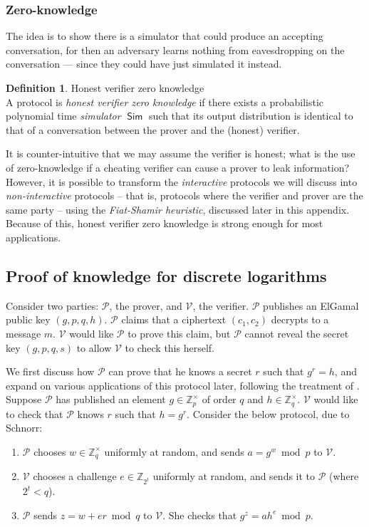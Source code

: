 \documentclass[11pt,twoside,a4paper]{article}
\DeclareMathOperator{\Sim}{\mathsf{Sim}}
\theoremstyle{definition}
\newtheorem{definition}{Definition}[section]
\begin{document}
\subsubsection{Zero-knowledge}
The idea is to show there is a simulator that could produce an accepting conversation, for then an adversary learns nothing from eavesdropping on the conversation --- since they could have just simulated it instead.~\cite{boneh2015graduate}
\begin{definition}{Honest verifier zero knowledge}\\
    A protocol is \textit{honest verifier zero knowledge} if there exists a probabilistic polynomial time \textit{simulator} \(\Sim\) such that its output distribution is identical to that of a conversation between the prover and the (honest) verifier.
\end{definition}
It is counter-intuitive that we may assume the verifier is honest; what is the use of zero-knowledge if a cheating verifier can cause a prover to leak information? However, it is possible to transform the \textit{interactive} protocols we will discuss into \textit{non-interactive} protocols -- that is, protocols where the verifier and prover are the same party -- using the \textit{Fiat-Shamir heuristic}, discussed later in this appendix. Because of this, honest verifier zero knowledge is strong enough for most applications.
\subsection{Proof of knowledge for discrete logarithms}
Consider two parties: \(\mathcal{P}\), the prover, and \(\mathcal{V}\), the verifier. \(\mathcal{P}\) publishes an ElGamal public key \((g,p,q,h)\). \(\mathcal{P}\) claims that a ciphertext \((c_1, c_2)\) decrypts to a message \(m\). \(\mathcal{V}\) would like \(\mathcal{P}\) to prove this claim, but \(\mathcal{P}\) cannot reveal the secret key \((g,p,q,s)\) to allow \(\mathcal{V}\) to check this herself.

We first discuss how \(\mathcal{P}\) can prove that he knows a secret \(r\) such that \(g^r=h\), and expand on various applications of this protocol later, following the treatment of \cite{damgaard2002sigma}. Suppose \(\mathcal{P}\) has published an element \(g\in\mathbb{Z}^\times_p\) of order \(q\) and \(h\in\mathbb{Z}^\times_q\). \(\mathcal{V}\) would like to check that \(\mathcal{P}\) knows \(r\) such that \(h=g^r\). Consider the below protocol, due to Schnorr:
\begin{enumerate}
    \item \(\mathcal{P}\) chooses \(w\in\mathbb{Z}^\times_q\) uniformly at random, and sends \(a=g^w\bmod p\) to \(\mathcal{V}\).
    \item \(\mathcal{V}\) chooses a challenge \(e\in\mathbb{Z}_{2^t}\) uniformly at random, and sends it to \(\mathcal{P}\) (where \(2^t<q\)).
    \item \(\mathcal{P}\) sends \(z=w+er\bmod q\) to \(\mathcal{V}\). She checks that \(g^z=ah^e\bmod p\).
\end{enumerate}
\end{document}
